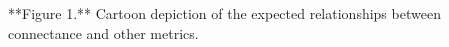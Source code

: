 **Figure 1.** Cartoon depiction of the expected relationships between
connectance and other metrics.
